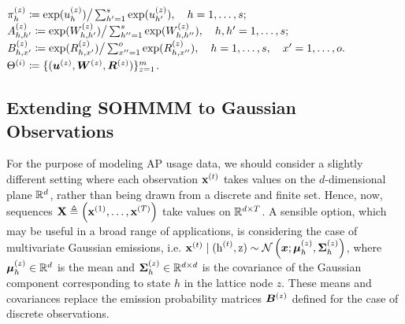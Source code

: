 \begin{algorithm}
\begin{algorithmic}[1]
		\vspace{0.3cm}
		\State ${\pi}_h^{(z)} \coloneqq \exp({u}_h^{(z)}) \big/ \sum_{h'=1}^{s}\exp({u}_{h'}^{(z)}), \quad h = 1, \dots, s;$
		\vspace{0.3cm}
		\State $ {A}^{(z)}_{h,h'} \coloneqq \exp({W}^{(z)}_{h,h'}) \big/ \sum_{h''=1}^{s} \exp({W}^{(z)}_{h,h''}), \quad h,h' = 1, \dots, s;$
		\vspace{0.3cm}
		\State ${B}^{(z)}_{h,x'} \coloneqq \exp({R}^{(z)}_{h,x'}) \big/ \sum_{x''=1}^{o} \exp({R}^{(z)}_{h,x''}), \quad h = 1, \dots, s, \quad x' = 1,\dots,o.$
		\vspace{0.3cm}
		\EndFor
		\vspace{0.3cm}
		\State $\Theta^{(i)} \coloneqq \lbrace ({\bm{u}}^{(z)}, {\bm{W}}^{(z)}, {\bm{R}}^{(z)}) \rbrace_{z=1}^m$.
		\vspace{0.3cm}
		\EndFor
		
	\end{algorithmic}
\end{algorithm}

\subsection{Extending SOHMMM to Gaussian Observations}
\label{sec:sohmmm_gaussian}

For the purpose of modeling AP usage data, we should consider a slightly different setting where each observation ${\mathbf{x}}^{(t)}$ takes values on the $d$-dimensional plane ${\mathbb{R}}^d$, rather than being drawn from a discrete and finite set. Hence, now, sequences ${\mathbf{X}} \triangleq \left({\mathbf{x}}^{(1)}, \dots, {\mathbf{x}}^{(T)} \right)$ take values on ${\mathbb{R}}^{d \times T}$. A sensible option, which may be useful in a broad range of applications, is considering the case of multivariate Gaussian emissions, i.e. ${\mathbf{x}}^{(t)} \mid ({\textnormal{h}}^{(t)}, {\textnormal{z}}) \sim \mathcal{N}\left({\bm{x}}; {\bm{\mu}}^{(z)}_h, {\bm{\Sigma}}^{(z)}_h\right)$, where ${\bm{\mu}}^{(z)}_h \in {\mathbb{R}}^d$ is the mean and ${\bm{\Sigma}}^{(z)}_h \in {\mathbb{R}}^{d \times d}$ is the covariance of the Gaussian component corresponding to state $h$ in the lattice node $z$. These means and covariances replace the emission probability matrices ${\bm{B}}^{(z)}$ defined for the case of discrete observations.

